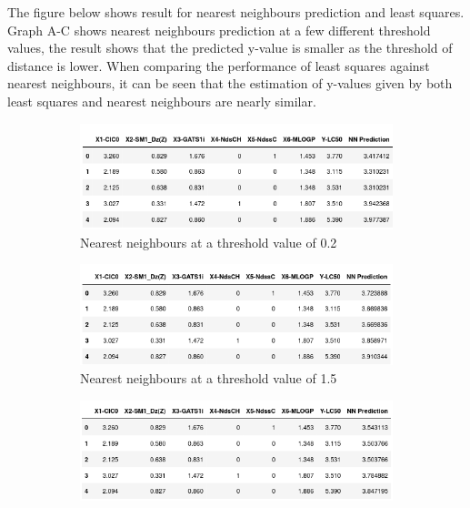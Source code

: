 \documentclass{ueacmpstyle}
\begin{document}
	    The figure below shows result for nearest neighbours prediction and least squares. Graph A-C shows nearest neighbours prediction at a few different threshold values, the result shows that the predicted y-value is smaller as the threshold of distance is lower. When comparing the performance of least squares against nearest neighbours, it can be seen that the estimation of y-values given by both least squares and nearest neighbours are nearly similar.
	    
		\begin{figure}[!htb]
			\centering
			\begin{subfigure}[!htb]{0.45\textwidth}
				\centering
				\includegraphics[width=\textwidth]{simple_nn_data1.png}
				\caption{Nearest neighbours at a threshold value of 0.2}
				\label{fig4:x1}
			\end{subfigure}
			\hfill
			\begin{subfigure}[!htb]{0.45\textwidth}
				\centering
				\includegraphics[width=\textwidth]{simple_nn_data2.png}
				\caption{Nearest neighbours at a threshold value of 1.5}
				\label{fig4:x2}
			\end{subfigure}
			\hfill
			\begin{subfigure}[!htb]{0.45\textwidth}
				\centering
				\includegraphics[width=\textwidth]{simple_nn_data3.png}

\end{subfigure}
\end{figure}
\end{document}
